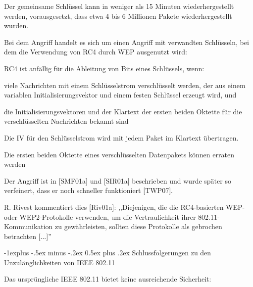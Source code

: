 \documentclass[a4paper]{article}
\makeatletter
\renewcommand{\subsection}{\@startsection{subsection}{2}{0mm}%
 {-1explus -.5ex minus -.2ex}%
 {0.5ex plus .2ex}%
 {\normalfont\normalsize\bfseries}}
\makeatother
\begin{document}
\begin{multicols}{3}
\begin{itemize*}
            \begin{itemize*}
                  \item Der gemeinsame Schlüssel kann in weniger als 15 Minuten wiederhergestellt werden, vorausgesetzt, dass etwa 4 bis 6 Millionen Pakete wiederhergestellt wurden.
                  \item Bei dem Angriff handelt es sich um einen Angriff mit verwandten Schlüsseln, bei dem die Verwendung von RC4 durch WEP ausgenutzt wird:
                  \begin{itemize*} \item RC4 ist anfällig für die Ableitung von Bits eines Schlüssels, wenn:
                        \begin{itemize*} \item viele Nachrichten mit einem Schlüsselstrom verschlüsselt werden, der aus einem variablen Initialisierungsvektor und einem festen Schlüssel erzeugt wird, und \item die Initialisierungsvektoren und der Klartext der ersten beiden Oktette für die verschlüsselten Nachrichten bekannt sind \end{itemize*} \item Die IV für den Schlüsselstrom wird mit jedem Paket im Klartext übertragen. \item Die ersten beiden Oktette eines verschlüsselten Datenpakets können erraten werden \end{itemize*}
                  \item Der Angriff ist in {[}SMF01a{]} und {[}SIR01a{]} beschrieben und wurde später so verfeinert, dass er noch schneller funktioniert {[}TWP07{]}.
                  \item R. Rivest kommentiert dies {[}Riv01a{]}: ,,Diejenigen, die die RC4-basierten WEP- oder WEP2-Protokolle verwenden, um die Vertraulichkeit ihrer 802.11-Kommunikation zu gewährleisten, sollten diese Protokolle als gebrochen betrachten {[}...{]}''
            \end{itemize*}
      \end{itemize*}


      \subsection{Schlussfolgerungen zu den Unzulänglichkeiten von IEEE
            802.11}

      \begin{itemize*}
            \item
            Das ursprüngliche IEEE 802.11 bietet keine ausreichende Sicherheit:


\end{itemize*}
\end{multicols}
\end{document}
